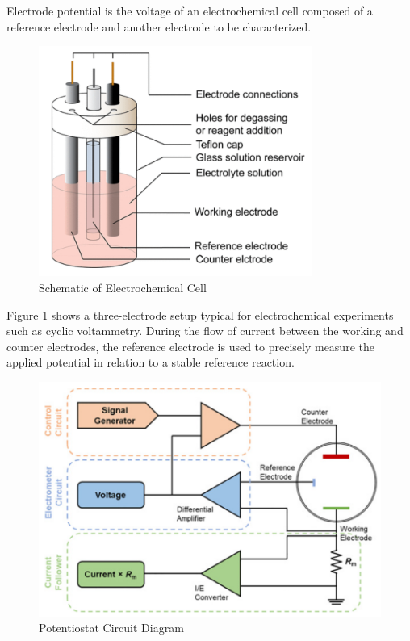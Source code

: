 Electrode potential is the voltage of an electrochemical cell composed of a reference electrode and another electrode to be characterized.
\begin{figure}[h!]
  \centering
    \includegraphics[width=0.8\textwidth]{figures/cv_diagram.png}
    \caption{Schematic of Electrochemical Cell \cite{Elgrishi2018}}
    \label{cell_schematic}
\end{figure}
Figure \ref{cell_schematic} shows a three-electrode setup typical for electrochemical experiments such as cyclic voltammetry. During the flow of current between the working and counter electrodes, the reference electrode is used to precisely measure the applied potential in relation to a stable reference reaction.
\begin{figure}[h!]
  \centering
    \includegraphics[width=1.0\textwidth]{figures/potentiostat_diagram.png}
    \caption{Potentiostat Circuit Diagram}
    \label{potentiostat_diagram}
\end{figure}
